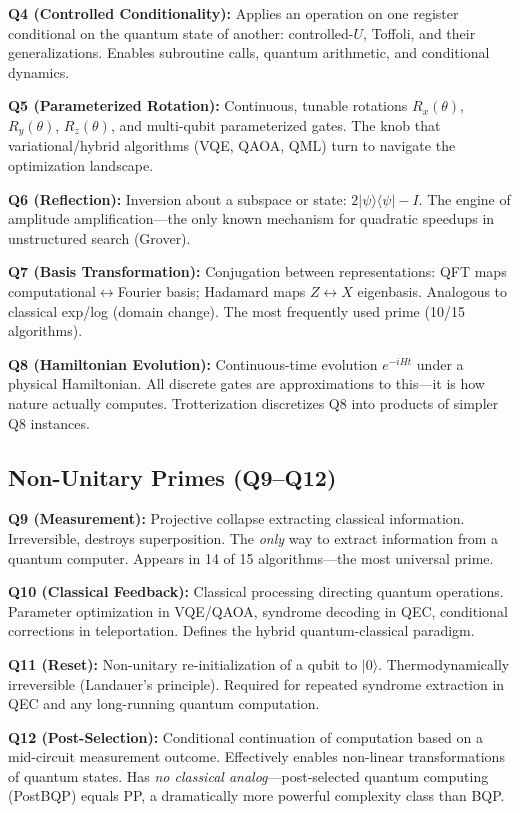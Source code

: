 \documentclass[11pt]{article}
\begin{document}
\textbf{Q4 (Controlled Conditionality):} Applies an operation on one register conditional on the quantum state of another: controlled-$U$, Toffoli, and their generalizations. Enables subroutine calls, quantum arithmetic, and conditional dynamics.

\textbf{Q5 (Parameterized Rotation):} Continuous, tunable rotations $R_x(\theta)$, $R_y(\theta)$, $R_z(\theta)$, and multi-qubit parameterized gates. The knob that variational/hybrid algorithms (VQE, QAOA, QML) turn to navigate the optimization landscape.

\textbf{Q6 (Reflection):} Inversion about a subspace or state: $2|\psi\rangle\langle\psi| - I$. The engine of amplitude amplification---the only known mechanism for quadratic speedups in unstructured search (Grover).

\textbf{Q7 (Basis Transformation):} Conjugation between representations: QFT maps computational$\leftrightarrow$Fourier basis; Hadamard maps $Z\leftrightarrow X$ eigenbasis. Analogous to classical exp/log (domain change). The most frequently used prime (10/15 algorithms).

\textbf{Q8 (Hamiltonian Evolution):} Continuous-time evolution $e^{-iHt}$ under a physical Hamiltonian. All discrete gates are approximations to this---it is how nature actually computes. Trotterization discretizes Q8 into products of simpler Q8 instances.

\subsection{Non-Unitary Primes (Q9--Q12)}

\textbf{Q9 (Measurement):} Projective collapse extracting classical information. Irreversible, destroys superposition. The \textit{only} way to extract information from a quantum computer. Appears in 14 of 15 algorithms---the most universal prime.

\textbf{Q10 (Classical Feedback):} Classical processing directing quantum operations. Parameter optimization in VQE/QAOA, syndrome decoding in QEC, conditional corrections in teleportation. Defines the hybrid quantum-classical paradigm.

\textbf{Q11 (Reset):} Non-unitary re-initialization of a qubit to $|0\rangle$. Thermodynamically irreversible (Landauer's principle). Required for repeated syndrome extraction in QEC and any long-running quantum computation.

\textbf{Q12 (Post-Selection):} Conditional continuation of computation based on a mid-circuit measurement outcome. Effectively enables non-linear transformations of quantum states. Has \textit{no classical analog}---post-selected quantum computing (PostBQP) equals PP, a dramatically more powerful complexity class than BQP.
\end{document}
